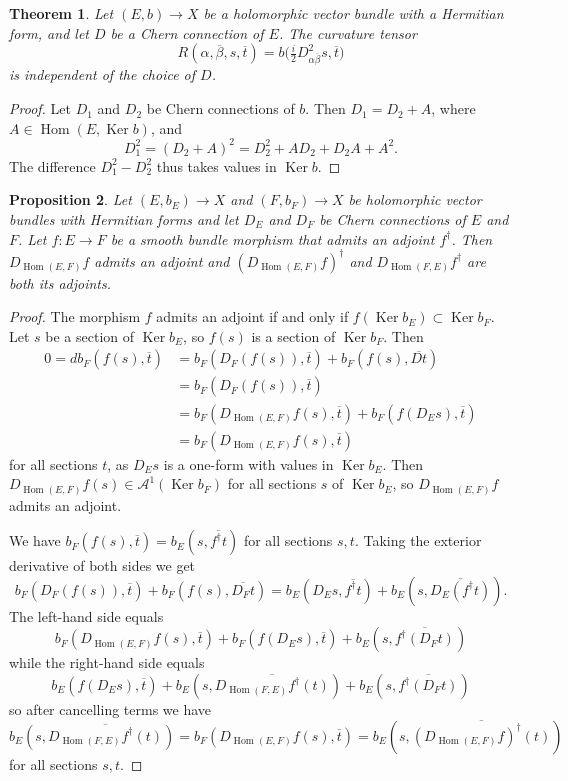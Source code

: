 \documentclass[10pt,a4paper]{amsart}
\newtheorem{theo}{Theorem}[section]
\newtheorem{prop}[theo]{Proposition}
\theoremstyle{definition}
\newcommand{\cc}[1]{\mathcal{#1}}
\def\ov#1{\overline{#1}}
\DeclareMathOperator{\Ker}{Ker}
\DeclareMathOperator{\Hom}{Hom}
\begin{document}
\begin{theo}
Let $(E, b) \to X$ be a holomorphic vector bundle with a Hermitian form, and let $D$ be a Chern connection of $E$. The curvature tensor
\[
R(\alpha,\ov\beta,s, \ov t)
= b\bigl(\tfrac i2 D^2_{\alpha\ov\beta}s, \ov t\bigr)
\]
is independent of the choice of $D$.
\end{theo}

\begin{proof}
Let $D_1$ and $D_2$ be Chern connections of $b$. Then $D_1 = D_2 + A$, where $A \in \Hom(E, \Ker b)$, and
\[
D_1^2
= (D_2 + A)^2
= D_2^2 + A D_2 + D_2 A + A^2.
\]
The difference $D_1^2 - D_2^2$ thus takes values in $\Ker b$.
\end{proof}




\begin{prop}
\label{prop:hom-adjoint}
Let $(E,b_E) \to X$ and $(F,b_F) \to X$ be holomorphic vector bundles with
Hermitian forms and let $D_E$ and $D_F$ be Chern connections of $E$ and $F$.
Let $f : E \to F$ be a smooth bundle morphism that admits an adjoint
$f^\dagger$. Then $D_{\Hom(E,F)}f$ admits an adjoint and
$(D_{\Hom(E,F)}f)^\dagger$ and $D_{\Hom(F,E)}f^\dagger$ are both its adjoints.
\end{prop}


\begin{proof}
The morphism $f$ admits an adjoint if and only if $f(\Ker b_E) \subset \Ker b_F$. Let $s$ be a section of $\Ker b_E$, so $f(s)$ is a section of $\Ker b_F$. Then
\begin{align*}
0 = d b_F(f(s), \ov t)
&= b_F(D_F(f(s)), \ov t) + b_F(f(s), \ov{Dt})
\\
&= b_F(D_F(f(s)), \ov t)
\\
&= b_F(D_{\Hom(E,F)}f(s), \ov t) + b_F(f(D_Es), \ov t)
\\
&= b_F(D_{\Hom(E,F)}f(s), \ov t)
\end{align*}
for all sections $t$, as $D_Es$ is a one-form with values in $\Ker b_E$. Then $D_{\Hom(E,F)} f(s) \in \cc A^1(\Ker b_F)$ for all sections $s$ of $\Ker b_E$, so $D_{\Hom(E,F)}f$ admits an adjoint.

We have $b_F(f(s), \ov{t}) = b_E(s, \ov{f^\dagger t})$ for all sections $s,t$. Taking the exterior derivative of both sides we get
\[
b_F(D_F(f(s)), \ov t) + b_F(f(s), \ov{D_F t})
= b_E(D_E s, \ov {f^\dagger t}) + b_E(s, \ov{D_E(f^\dagger t)}).
\]
The left-hand side equals
\[
b_F(D_{\Hom(E,F)}f(s), \ov t)
+ b_F(f(D_Es), \ov t)
+ b_E(s, \ov{f^\dagger(D_F t)})
\]
while the right-hand side equals
\[
b_E(f(D_E s), \ov t)
+ b_E(s, \ov{D_{\Hom(F,E)}f^\dagger(t)})
+ b_E(s, \ov{f^\dagger(D_F t)})
\]
so after cancelling terms we have
\[
b_E(s, \ov{D_{\Hom(F,E)}f^\dagger(t)})
= b_F(D_{\Hom(E,F)}f(s), \ov t)
= b_E(s, \ov{(D_{\Hom(E,F)}f)^\dagger(t)})
\]
for all sections $s,t$.
\end{proof}
\end{document}
